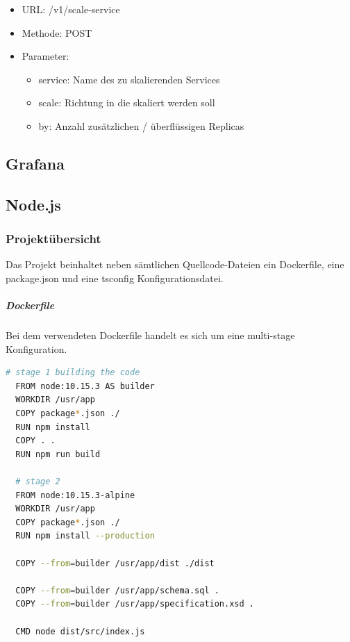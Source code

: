 \begin{itemize}
  \item URL: /v1/scale-service
  \item Methode: POST
  \item Parameter:
  \begin{itemize}
    \item service: Name des zu skalierenden Services
    \item scale: Richtung in die skaliert werden soll 
    \item by: Anzahl zusätzlichen / überflüssigen Replicas
  \end{itemize}
\end{itemize}


\subsection{Grafana}








\subsection{Node.js}


\subsubsection{Projektübersicht}
Das Projekt beinhaltet neben sämtlichen Quellcode-Dateien ein Dockerfile, eine package.json und eine tsconfig Konfigurationsdatei. 

\subparagraph{Dockerfile}
Bei dem verwendeten Dockerfile handelt es sich um eine multi-stage Konfiguration. 

\begin{lstlisting}[language=bash]
  # stage 1 building the code
  FROM node:10.15.3 AS builder
  WORKDIR /usr/app
  COPY package*.json ./
  RUN npm install
  COPY . .
  RUN npm run build 
  
  # stage 2
  FROM node:10.15.3-alpine
  WORKDIR /usr/app
  COPY package*.json ./
  RUN npm install --production
  
  COPY --from=builder /usr/app/dist ./dist
  
  COPY --from=builder /usr/app/schema.sql .
  COPY --from=builder /usr/app/specification.xsd .
  
  CMD node dist/src/index.js
\end{lstlisting}

